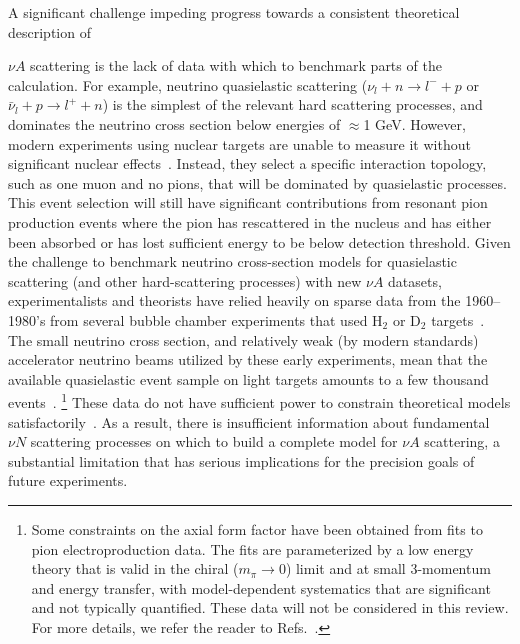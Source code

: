 \documentclass{ar-1col}
\def\asm#1{{\color{blue}#1}}
\def\del#1{}
\def\done#1{{\color{brown}#1}}
\begin{document}
A significant challenge impeding progress towards a consistent theoretical description of%
\begin{marginnote}
\end{marginnote}%
$\nu A$ scattering is the lack of data \done{with which} to benchmark parts of the calculation. %
For example, neutrino quasielastic scattering ($\nu_{l} + n \rightarrow l^{-} + p$ or $\bar{\nu}_{l} + p \rightarrow l^{+} + n$) is the simplest of the relevant hard scattering processes, and dominates the neutrino cross section below energies of $\approx$1 GeV. However, modern experiments using nuclear targets are unable to measure it without significant nuclear effects~\cite{garvey_review_2014, NuSTEC:2017hzk}.
\done{Instead, they \del{measure}\asm{select} a specific \del{final state}\asm{interaction topology}, such as one muon and no pions, \del{which}\asm{that} will be dominated by quasielastic processes\del{, but which will }\asm{. This event selection will still }have significant contributions from resonant pion production events where the pion has rescattered in the nucleus and has either been absorbed or has lost sufficient energy to be below detection threshold.}
\done{Given the challenge to benchmark neutrino cross-section models for quasielastic scattering (and other hard-scattering processes) with new $\nu A$ datasets, experiment\asm{alist}s and theorists have relied heavily on sparse data from the 1960--1980's from several bubble chamber experiments \del{which}\asm{that} used H$_{2}$ or D$_2$ targets~\cite{zeller12, ParticleDataGroup:2020ssz}.}
The small neutrino cross section, and relatively weak (by modern standards) accelerator neutrino beams utilized by these early experiments, mean that the available quasielastic event sample on light targets amounts to a few thousand events~\cite{ANL_Barish_1977, BNL_Fanourakis_1980, BNL_Baker_1981, Kitagaki:1983px, Allasia:1990uy}.%
\footnote{Some constraints on the axial form factor have been obtained from fits
 to pion electroproduction data.
The fits are parameterized by a low energy theory that is valid in the chiral
 ($m_\pi\to0$) limit and \del{close to threshold}\asm{at small 3-momentum and energy transfer,
 with model-dependent systematics that are significant and not typically quantified}.
These data will \done{not be considered}\del{be ignored} in this review.
For more details, we refer the reader to Refs.~\cite{Bernard:1993bq,Bernard:2001rs}.
}
\done{These data do not have sufficient power to constrain theoretical models satisfactorily~\cite{Meyer:2016oeg, Hill:2017wgb}. As a result, there is insufficient information about fundamental $\nu N$ scattering processes on which to build a complete model for $\nu A$ scattering, a substantial limitation \asm{that}\del{which} has serious implications for the precision goals of future experiments.}
\end{document}
